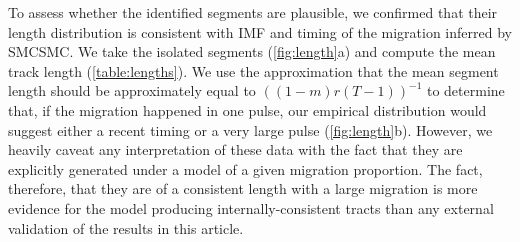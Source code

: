 To assess whether the identified segments are plausible, we confirmed that their length distribution is consistent with IMF and timing of the migration inferred by SMCSMC. We take the isolated segments (\autoref{fig:length}a) and compute the mean track length (\autoref{table:lengths}). We use the approximation that the mean segment length should be approximately equal to $((1-m)r(T-1))^{-1}$ to determine that, if the migration happened in one pulse, our empirical distribution would suggest either a recent timing or a very large pulse (\autoref{fig:length}b). However, we heavily caveat any interpretation of these data with the fact that they are explicitly generated under a model of a given migration proportion. The fact, therefore, that they are of a consistent length with a large migration is more evidence for the model producing internally-consistent tracts than any external validation of the results in this article. 


